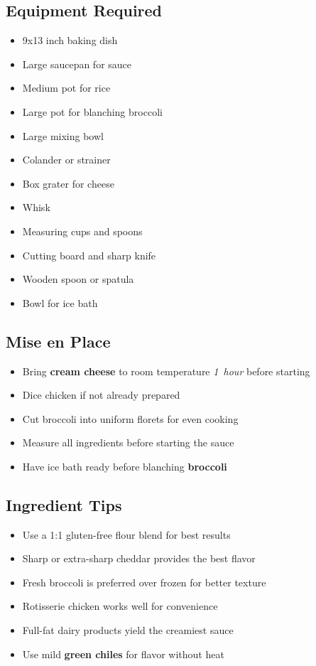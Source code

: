 \documentclass[11pt,letterpaper]{article}
\begin{document}
{\small
\setlength{\columnsep}{20pt}
\setlength{\multicolsep}{6pt}
\begin{multicols}{2}
\setlength{\parindent}{0pt}
\setlength{\parskip}{4pt}

\subsection*{Equipment Required}
\begin{itemize}
    \item 9x13 inch baking dish
    \item Large saucepan for sauce
    \item Medium pot for rice
    \item Large pot for blanching broccoli
    \item Large mixing bowl
    \item Colander or strainer
    \item Box grater for cheese
    \item Whisk
    \item Measuring cups and spoons
    \item Cutting board and sharp knife
    \item Wooden spoon or spatula
    \item Bowl for ice bath
\end{itemize}

\subsection*{Mise en Place}
\begin{itemize}
    \item Bring \textbf{cream cheese} to room temperature \textit{1~hour} before starting
    \item Dice chicken if not already prepared
    \item Cut broccoli into uniform florets for even cooking
    \item Measure all ingredients before starting the sauce
    \item Have ice bath ready before blanching \textbf{broccoli}
\end{itemize}

\subsection*{Ingredient Tips}
\begin{itemize}
    \item Use a 1:1 gluten-free flour blend for best results
    \item Sharp or extra-sharp cheddar provides the best flavor
    \item Fresh broccoli is preferred over frozen for better texture
    \item Rotisserie chicken works well for convenience
    \item Full-fat dairy products yield the creamiest sauce
    \item Use mild \textbf{green chiles} for flavor without heat
\end{itemize}


\end{multicols}}
\end{document}
